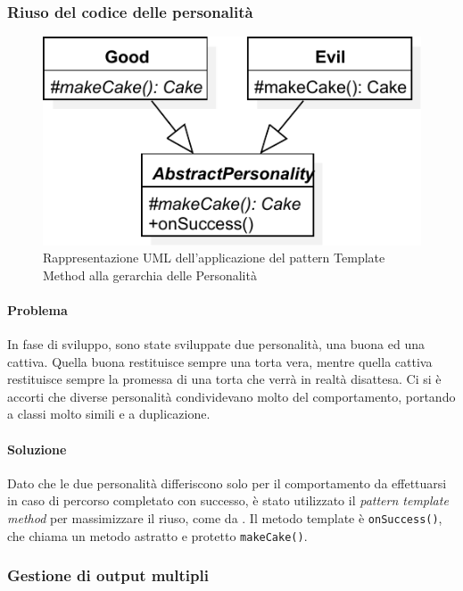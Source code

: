 \documentclass[a4paper,12pt]{report}
\begin{document}
\subsubsection{Riuso del codice delle personalità}

\begin{figure}[H]
\centering{}
\includegraphics[width=\textwidth]{img/template}
\caption{Rappresentazione UML dell'applicazione del pattern Template Method alla gerarchia delle Personalità}
\label{img:template}
\end{figure}

\paragraph{Problema} In fase di sviluppo, sono state sviluppate due personalità, una buona ed una cattiva.
Quella buona restituisce sempre una torta vera, mentre quella cattiva restituisce sempre la
promessa di una torta che verrà in realtà disattesa.
Ci si è accorti che diverse personalità condividevano molto del comportamento,
portando a classi molto simili e a duplicazione.

\paragraph{Soluzione} Dato che le due personalità differiscono solo per il comportamento da effettuarsi in caso di percorso completato con successo,
è stato utilizzato il \textit{pattern template method} per massimizzare il riuso, come da .
Il metodo template è \texttt{onSuccess()}, che chiama un metodo astratto e protetto
\texttt{makeCake()}.

\subsubsection{Gestione di output multipli}
\end{document}
